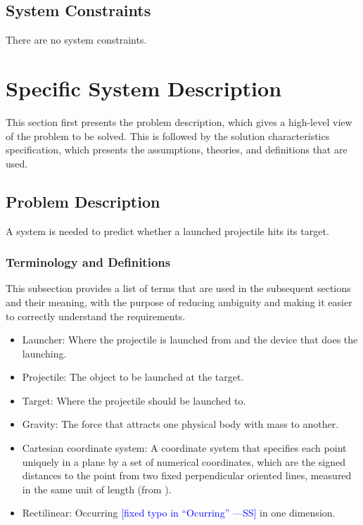 \documentclass[12pt]{article}
\newcommand{\authornote}[3]{\textcolor{#1}{[#3 ---#2]}}
\newcommand{\authornote}[3]{}
\newcommand{\wss}[1]{\authornote{blue}{SS}{#1}}
\begin{document}
\subsection{System Constraints}
\label{Sec:SysConstraints}
There are no system constraints.

\section{Specific System Description}
\label{Sec:SpecSystDesc}
This section first presents the problem description, which gives a high-level view of the problem to be solved. This is followed by the solution characteristics specification, which presents the assumptions, theories, and definitions that are used.

\subsection{Problem Description}
\label{Sec:ProbDesc}
A system is needed to predict whether a launched projectile hits its target.

\subsubsection{Terminology and Definitions}
\label{Sec:TermDefs}
This subsection provides a list of terms that are used in the subsequent sections and their meaning, with the purpose of reducing ambiguity and making it easier to correctly understand the requirements.

\begin{itemize}
\item{Launcher: Where the projectile is launched from and the device that does the launching.}
\item{Projectile: The object to be launched at the target.}
\item{Target: Where the projectile should be launched to.}
\item{Gravity: The force that attracts one physical body with mass to another.}
\item{Cartesian coordinate system: A coordinate system that specifies each point uniquely in a plane by a set of numerical coordinates, which are the signed distances to the point from two fixed perpendicular oriented lines, measured in the same unit of length (from \cite{cartesianWiki}).}
\item{Rectilinear: Occurring \wss{fixed typo in ``Ocurring''} in one dimension.}
\end{itemize}
\end{document}

